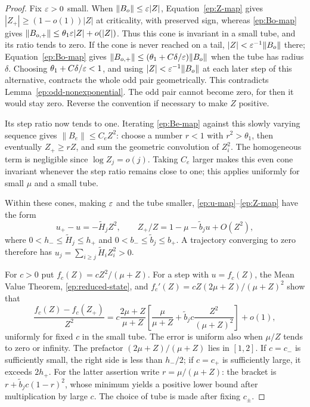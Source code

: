 \begin{proof}
Fix $\varepsilon>0$ small.  When
$\|B_o\|\le\varepsilon|Z|$, Equation~\eqref{ep:Z-map}
gives $|Z_+|\ge(1-o(1))|Z|$ at criticality, with preserved
sign, whereas \eqref{ep:Bo-map} gives
$\|B_{o,+}\|\le\theta_1\varepsilon|Z|+o(|Z|)$.
Thus this cone is invariant in a small tube, and its ratio
tends to zero.  If the cone is never reached on a tail,
$|Z|<\varepsilon^{-1}\|B_o\|$ there; Equation~\eqref{ep:Bo-map} gives
$\|B_{o,+}\|\le(\theta_1+C\delta/\varepsilon)\|B_o\|$
when the tube has radius $\delta$.  Choosing
$\theta_1+C\delta/\varepsilon<1$, and using
$|Z|<\varepsilon^{-1}\|B_o\|$ at each later step of this
alternative, contracts the whole odd pair geometrically.
This contradicts Lemma~\ref{ep:odd-nonexponential}.
The odd pair cannot become zero, for then it would stay zero.
Reverse the convention if necessary to make $Z$ positive.

Its step ratio now tends to one.  Iterating
\eqref{ep:Be-map} against this slowly varying sequence gives
$\|B_e\|\le C_eZ^2$: choose a number $r<1$ with
$r^2>\theta_1$, then eventually $Z_+\ge rZ$,
and sum the geometric convolution of $Z_i^2$.
The homogeneous term is negligible since
$\log Z_j=o(j)$.  Taking $C_e$ larger makes this even
cone invariant whenever the step ratio remains close to
one; this applies uniformly for small $\mu$ and a small tube.

Within these cones, making $\varepsilon$ and the tube smaller,
\eqref{ep:u-map}--\eqref{ep:Z-map} have the form
\begin{equation}\label{ep:reduced-state}
 u_+-u=-\widetilde H_j Z^2,\qquad
 Z_+/Z=1-\mu-\widetilde b_j u+O(Z^2),
\end{equation}
where $0<h_-\le\widetilde H_j\le h_+$ and
$0<b_-\le\widetilde b_j\le b_+$.
A trajectory converging to zero therefore has
$u_j=\sum_{i\ge j}\widetilde H_iZ_i^2>0$.

For $c>0$ put $f_c(Z)=cZ^2/(\mu+Z)$.
For a step with $u=f_c(Z)$, the Mean Value Theorem,
\eqref{ep:reduced-state}, and
$f_c'(Z)=cZ(2\mu+Z)/(\mu+Z)^2$ show that
\begin{equation}\label{ep:barrier-decrement}
 \frac{f_c(Z)-f_c(Z_+)}{Z^2}
 =
 c\frac{2\mu+Z}{\mu+Z}
 \left[\frac{\mu}{\mu+Z}
       +\widetilde b_jc\frac{Z^2}{(\mu+Z)^2}\right]
 +o(1),
\end{equation}
uniformly for fixed $c$ in the small tube.
The error is uniform also when $\mu/Z$ tends to zero or
infinity.  The prefactor $(2\mu+Z)/(\mu+Z)$ lies in
$[1,2]$.  If $c=c_-$ is sufficiently small, the right side
is less than $h_-/2$; if $c=c_+$ is sufficiently large, it
exceeds $2h_+$.  For the latter assertion write
$r=\mu/(\mu+Z)$: the bracket is
$r+\widetilde b_jc(1-r)^2$, whose minimum yields a
positive lower bound after multiplication by large $c$.
The choice of tube is made after fixing $c_\pm$.


\end{proof}
